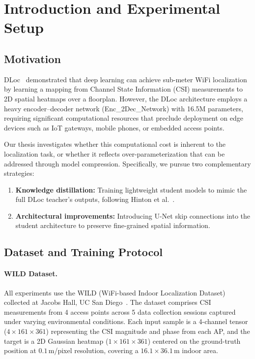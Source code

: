 \documentclass[11pt,a4paper]{article}
\begin{document}
\tableofcontents
\newpage


\section{Introduction and Experimental Setup}
\label{sec:intro}

\subsection{Motivation}

DLoc~\cite{ayyalasomayajula2020deep} demonstrated that deep learning can achieve sub-meter WiFi localization by learning a mapping from Channel State Information (CSI) measurements to 2D spatial heatmaps over a floorplan.
However, the DLoc architecture employs a heavy encoder--decoder network (Enc\_2Dec\_Network) with 16.5M parameters, requiring significant computational resources that preclude deployment on edge devices such as IoT gateways, mobile phones, or embedded access points.

Our thesis investigates whether this computational cost is inherent to the localization task, or whether it reflects over-parameterization that can be addressed through model compression.
Specifically, we pursue two complementary strategies:
\begin{enumerate}[nosep]
  \item \textbf{Knowledge distillation:} Training lightweight student models to mimic the full DLoc teacher's outputs, following Hinton et al.~\cite{hinton2015distilling}.
  \item \textbf{Architectural improvements:} Introducing U-Net skip connections into the student architecture to preserve fine-grained spatial information.
\end{enumerate}

\subsection{Dataset and Training Protocol}

\paragraph{WILD Dataset.}
All experiments use the WILD (WiFi-based Indoor Localization Dataset) collected at Jacobs Hall, UC San Diego~\cite{ayyalasomayajula2020deep}.
The dataset comprises CSI measurements from 4 access points across 5 data collection sessions captured under varying environmental conditions.
Each input sample is a 4-channel tensor ($4 \times 161 \times 361$) representing the CSI magnitude and phase from each AP, and the target is a 2D Gaussian heatmap ($1 \times 161 \times 361$) centered on the ground-truth position at $0.1$\,m/pixel resolution, covering a $16.1 \times 36.1$\,m indoor area.
\end{document}
